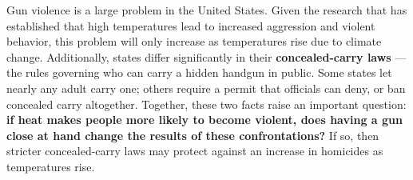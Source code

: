 \documentclass[
  11pt,
]{article}
\newcommand{\sectionhead}[1]{%
  \vspace{2pt}{\color{ink}\bfseries\fontsize{9.75pt}{12pt}\selectfont
  \textls[20]{\MakeUppercase{#1}}\par}\vspace{1pt}}
\begin{document}
\vspace{6pt}

\sectionhead{Background}

%
\noindent Gun violence is a large problem in the United States. Given the research that has established that high temperatures lead to increased aggression and violent behavior, this problem will only increase as temperatures rise due to climate change. Additionally, states differ significantly in their \textbf{concealed-carry laws} --- the rules governing who can carry a hidden handgun in public. Some states let nearly any adult carry one; others require a permit that officials can deny, or ban concealed carry altogether. Together, these two facts raise an important question: \textbf{if heat makes people more likely to become violent, does having a gun close at hand change the results of these confrontations?} If so, then stricter concealed-carry laws may protect against an increase in homicides as temperatures rise.
\end{document}
